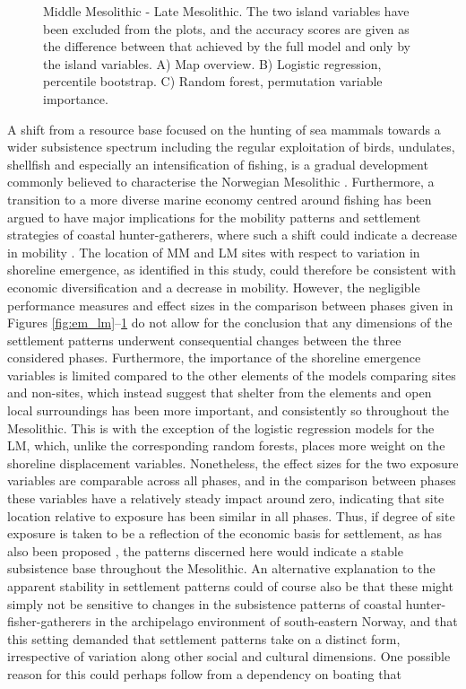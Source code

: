 \documentclass[12pt, a4paper]{article}
\begin{document}
\begin{figure}
	\caption[Middle Mesolithic- Late Mesolithic]{Middle Mesolithic - Late Mesolithic. The two island variables have been excluded from the plots, and the accuracy scores are given as the difference between that achieved by the full model and only by the island variables. A) Map overview. B) Logistic regression, percentile bootstrap. C) Random forest, permutation variable importance.}
	\label{fig:mm_lm}
\end{figure}

A shift from a resource base focused on the hunting of sea mammals towards a wider subsistence spectrum including the regular exploitation of birds, undulates, shellfish and especially an intensification of fishing, is a gradual development commonly believed to characterise the Norwegian Mesolithic \citep[see][]{breivik2014, bjerck2016, ritchie2016, jorgensen2020, mjaerum2020}. Furthermore, a transition to a more diverse marine economy centred around fishing has been argued to have major implications for the mobility patterns and settlement strategies of coastal hunter-gatherers, where such a shift could indicate a decrease in mobility \citep[e.g.][]{boethius2017, boethius2018, jorgensen2020}. The location of MM and LM sites with respect to variation in shoreline emergence, as identified in this study, could therefore be consistent with economic diversification and a decrease in mobility. However, the negligible performance measures and effect sizes in the comparison between phases given in Figures \ref{fig:em_lm}--\ref{fig:mm_lm} do not allow for the conclusion that any dimensions of the settlement patterns underwent consequential changes between the three considered phases. Furthermore, the importance of the shoreline emergence variables is limited compared to the other elements of the models comparing sites and non-sites, which instead suggest that shelter from the elements and open local surroundings has been more important, and consistently so throughout the Mesolithic. This is with the exception of the logistic regression models for the LM, which, unlike the corresponding random forests, places more weight on the shoreline displacement variables. Nonetheless, the effect sizes for the two exposure variables are comparable across all phases, and in the comparison between phases these variables have a relatively steady impact around zero, indicating that site location relative to exposure has been similar in all phases. Thus, if degree of site exposure is taken to be a reflection of the economic basis for settlement, as has also been proposed \citep{bjeck2009, breivik2014}, the patterns discerned here would indicate a stable subsistence base throughout the Mesolithic. An alternative explanation to the apparent stability in settlement patterns could of course also be that these might simply not be sensitive to changes in the subsistence patterns of coastal hunter-fisher-gatherers in the archipelago environment of south-eastern Norway, and that this setting demanded that settlement patterns take on a distinct form, irrespective of variation along other social and cultural dimensions. One possible reason for this could perhaps follow from a dependency on boating that 
\end{document}
